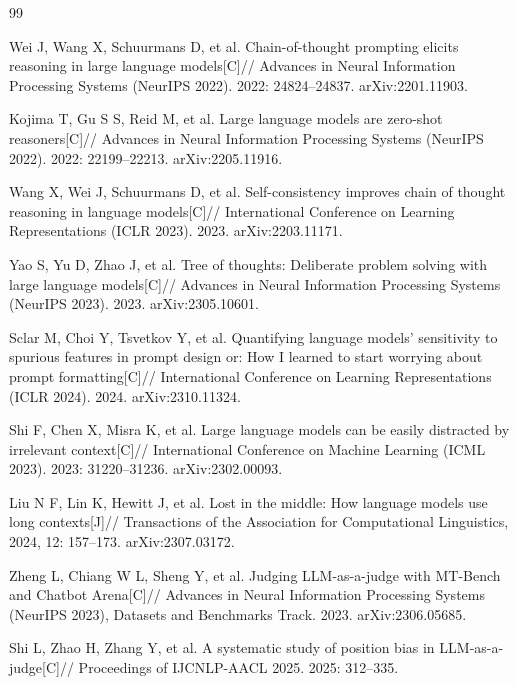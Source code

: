 \documentclass[11pt,a4paper]{article}
\begin{document}
\begin{thebibliography}{99}
\setlength{\itemsep}{0.2em}

Wei J, Wang X, Schuurmans D, et al.
Chain-of-thought prompting elicits reasoning in large language models[C]//
Advances in Neural Information Processing Systems (NeurIPS 2022). 2022: 24824--24837.
arXiv:2201.11903.

Kojima T, Gu S S, Reid M, et al.
Large language models are zero-shot reasoners[C]//
Advances in Neural Information Processing Systems (NeurIPS 2022). 2022: 22199--22213.
arXiv:2205.11916.

Wang X, Wei J, Schuurmans D, et al.
Self-consistency improves chain of thought reasoning in language models[C]//
International Conference on Learning Representations (ICLR 2023). 2023.
arXiv:2203.11171.

Yao S, Yu D, Zhao J, et al.
Tree of thoughts: Deliberate problem solving with large language models[C]//
Advances in Neural Information Processing Systems (NeurIPS 2023). 2023.
arXiv:2305.10601.

Sclar M, Choi Y, Tsvetkov Y, et al.
Quantifying language models' sensitivity to spurious features in prompt design or: How I learned to start worrying about prompt formatting[C]//
International Conference on Learning Representations (ICLR 2024). 2024.
arXiv:2310.11324.

Shi F, Chen X, Misra K, et al.
Large language models can be easily distracted by irrelevant context[C]//
International Conference on Machine Learning (ICML 2023). 2023: 31220--31236.
arXiv:2302.00093.

Liu N F, Lin K, Hewitt J, et al.
Lost in the middle: How language models use long contexts[J]//
Transactions of the Association for Computational Linguistics, 2024, 12: 157--173.
arXiv:2307.03172.

Zheng L, Chiang W L, Sheng Y, et al.
Judging LLM-as-a-judge with MT-Bench and Chatbot Arena[C]//
Advances in Neural Information Processing Systems (NeurIPS 2023), Datasets and Benchmarks Track. 2023.
arXiv:2306.05685.

Shi L, Zhao H, Zhang Y, et al.
A systematic study of position bias in LLM-as-a-judge[C]//
Proceedings of IJCNLP-AACL 2025. 2025: 312--335.


\end{thebibliography}
\end{document}
